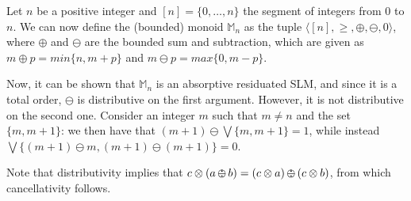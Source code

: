 \documentclass{llncs}
\def\monid{{\mathbf 0}}
\def\monop{\otimes}
\def\odiv{\, {\ominus\hspace{-7.7pt} \div} \,}
\def\monid{\mathbf{1}}
\begin{document}
\begin{example}
\label{nodist2}
%
Let $n$ be a positive integer and $[n] = \{0, \ldots, n\}$ the segment of integers from $0$ to $n$. We can now define the (bounded) monoid $\mathbb{M}_n$ 
as the tuple $\langle [n], \geq, \oplus, \ominus, 0 \rangle$, where $\oplus$ and $\ominus$ are the bounded sum and subtraction, 
which are given as $m\oplus p = min\{n, m+p\}$ and $m\ominus p = max\{0,m-p\}$.

Now, it can be shown that $\mathbb{M}_n$ is an absorptive residuated SLM, and since it is a total order,
$\ominus$ is  distributive on the first argument.
%
However, it is not distributive on the second one. Consider an integer $m$ such that 
$m \neq n$ and the set $\{m, m+1\}$:
we then have that $(m+1) \ominus \bigvee\{m, m+1\} = 1$,
while instead $\bigvee\{(m+1) \ominus m, (m+1) \ominus (m+1)\} = 0$.
\end{example}

\begin{remark}
Note that distributivity implies that $c \otimes (a \odiv b) = (c \otimes a) \odiv (c \otimes b)$,
from which cancellativity follows.
\end{remark}


\end{document}
